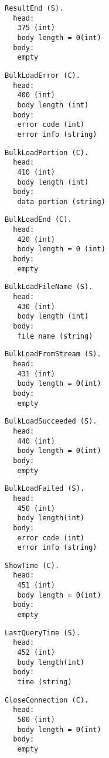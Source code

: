 \documentclass[a4paper,12pt]{article}
\begin{document}
\begin{verbatim}
ResultEnd (S).
  head:
   375 (int)
   body length = 0(int)
  body:
   empty
\end{verbatim}

\begin{verbatim}
BulkLoadError (C).
  head:
   400 (int)
   body length (int)
  body:
   error code (int)
   error info (string)
\end{verbatim}

\begin{verbatim}
BulkLoadPortion (C).
  head:
   410 (int)
   body length (int)
  body:
   data portion (string)
\end{verbatim}

\begin{verbatim}
BulkLoadEnd (C).
  head:
   420 (int)
   body length = 0 (int)
  body:
   empty
\end{verbatim}

\begin{verbatim}
BulkLoadFileName (S).
  head:
   430 (int)
   body length (int)
  body:
   file name (string)
\end{verbatim}

\begin{verbatim}
BulkLoadFromStream (S).
  head:
   431 (int)
   body length = 0(int)
  body:
   empty
\end{verbatim}

\begin{verbatim}
BulkLoadSucceeded (S).
  head:
   440 (int)
   body length = 0(int)
  body:
   empty
\end{verbatim}

\begin{verbatim}
BulkLoadFailed (S).
  head:
   450 (int)
   body length(int)
  body:
   error code (int)
   error info (string)
\end{verbatim}

\begin{verbatim}
ShowTime (C).
  head:
   451 (int)
   body length = 0(int)
  body:
   empty
\end{verbatim}

\begin{verbatim}
LastQueryTime (S).
  head:
   452 (int)
   body length(int)
  body:
   time (string)
\end{verbatim}

\begin{verbatim}
CloseConnection (C).
  head:
   500 (int)
   body length = 0(int)
  body:
   empty
\end{verbatim}
\end{document}
